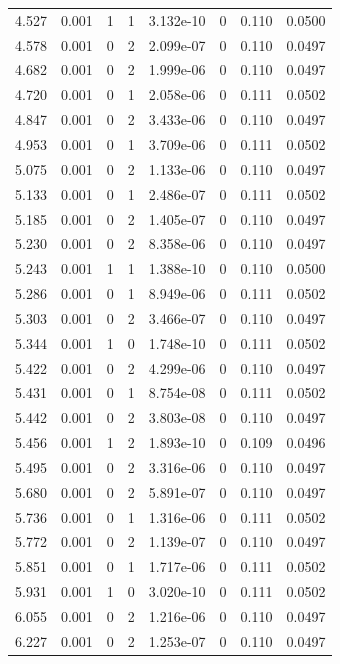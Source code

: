 \documentclass[preview]{standalone}
\begin{document}
{{{\begin{tabular}{L{1.2cm}C{1.2cm} C{0.3cm}C{0.5cm} C{1.4cm}C{1.4cm} C{1.4cm}C{1.4cm}}
  4.527  &  0.001  & 1     &  1 &  3.132e-10  & 0  & 0.110 &  0.0500   \\ 
  4.578  &  0.001  & 0     &  2 &  2.099e-07  & 0  & 0.110 &  0.0497   \\ 
  4.682  &  0.001  & 0     &  2 &  1.999e-06  & 0  & 0.110 &  0.0497   \\ 
  4.720  &  0.001  & 0     &  1 &  2.058e-06  & 0  & 0.111 &  0.0502   \\ 
  4.847  &  0.001  & 0     &  2 &  3.433e-06  & 0  & 0.110 &  0.0497   \\ 
  4.953  &  0.001  & 0     &  1 &  3.709e-06  & 0  & 0.111 &  0.0502   \\ 
  5.075  &  0.001  & 0     &  2 &  1.133e-06  & 0  & 0.110 &  0.0497   \\ 
  5.133  &  0.001  & 0     &  1 &  2.486e-07  & 0  & 0.111 &  0.0502   \\ 
  5.185  &  0.001  & 0     &  2 &  1.405e-07  & 0  & 0.110 &  0.0497   \\ 
  5.230  &  0.001  & 0     &  2 &  8.358e-06  & 0  & 0.110 &  0.0497   \\ 
  5.243  &  0.001  & 1     &  1 &  1.388e-10  & 0  & 0.110 &  0.0500   \\ 
  5.286  &  0.001  & 0     &  1 &  8.949e-06  & 0  & 0.111 &  0.0502   \\ 
  5.303  &  0.001  & 0     &  2 &  3.466e-07  & 0  & 0.110 &  0.0497   \\ 
  5.344  &  0.001  & 1     &  0 &  1.748e-10  & 0  & 0.111 &  0.0502   \\ 
  5.422  &  0.001  & 0     &  2 &  4.299e-06  & 0  & 0.110 &  0.0497   \\ 
  5.431  &  0.001  & 0     &  1 &  8.754e-08  & 0  & 0.111 &  0.0502   \\ 
  5.442  &  0.001  & 0     &  2 &  3.803e-08  & 0  & 0.110 &  0.0497   \\ 
  5.456  &  0.001  & 1     &  2 &  1.893e-10  & 0  & 0.109 &  0.0496   \\ 
  5.495  &  0.001  & 0     &  2 &  3.316e-06  & 0  & 0.110 &  0.0497   \\ 
  5.680  &  0.001  & 0     &  2 &  5.891e-07  & 0  & 0.110 &  0.0497   \\ 
  5.736  &  0.001  & 0     &  1 &  1.316e-06  & 0  & 0.111 &  0.0502   \\ 
  5.772  &  0.001  & 0     &  2 &  1.139e-07  & 0  & 0.110 &  0.0497   \\ 
  5.851  &  0.001  & 0     &  1 &  1.717e-06  & 0  & 0.111 &  0.0502   \\ 
  5.931  &  0.001  & 1     &  0 &  3.020e-10  & 0  & 0.111 &  0.0502   \\ 
  6.055  &  0.001  & 0     &  2 &  1.216e-06  & 0  & 0.110 &  0.0497   \\ 
  6.227  &  0.001  & 0     &  2 &  1.253e-07  & 0  & 0.110 &  0.0497   \\ 
\hline 
\end{tabular} 

}}}
\end{document}
